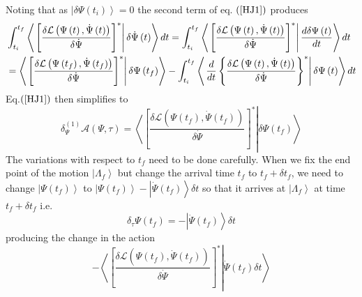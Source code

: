 \documentclass[aps,preprint]{revtex4}
\begin{document}
Noting that as $\left\vert \delta\Psi\left( t_{i}\right) \right\rangle =0$
the second term of eq. $\left( \ref{HJ1}\right) $ produces 
\begin{align}
& \int_{t_{i}}^{t_{f}}\left\langle \left. \left[ \frac{\delta\mathcal{L}%
\left( \Psi\left( t\right) ,\dot{\Psi}\left( t\right) \right) }{\delta\dot{%
\Psi}}\right] ^{\ast}\right\vert \delta\dot{\Psi}\left( t\right)
\right\rangle dt=\int_{t_{i}}^{t_{f}}\left\langle \left. \left[ \frac{\delta%
\mathcal{L}\left( \Psi\left( t\right) ,\dot{\Psi}\left( t\right) \right) }{%
\delta\dot{\Psi}}\right] ^{\ast}\right\vert \frac{d\delta\Psi\left( t\right) 
}{dt}\right\rangle dt  \notag \\
& =\left\langle \left. \left[ \frac{\delta\mathcal{L}\left( \Psi\left(
t_{f}\right) ,\dot{\Psi}\left( t_{f}\right) \right) }{\delta\dot{\Psi}}%
\right] ^{\ast}\right\vert \delta\Psi\left( t_{f}\right) \right\rangle
-\int_{t_{i}}^{t_{f}}\left\langle \left. \frac{d}{dt}\left\{ \frac {\delta%
\mathcal{L}\left( \Psi\left( t\right) ,\dot{\Psi}\left( t\right) \right) }{%
\delta\dot{\Psi}}\right\} ^{\ast}\right\vert \delta\Psi\left( t\right)
\right\rangle dt
\end{align}
Eq.$\left( \ref{HJ1}\right) $ then simplifies to 
\begin{equation}
\delta_{\Psi}^{\left( 1\right) }\mathcal{A}\left( \Psi,\tau\right)
=\left\langle \left. \left[ \frac{\delta\mathcal{L}\left( \Psi\left(
t_{f}\right) ,\dot{\Psi}\left( t_{f}\right) \right) }{\delta\dot{\Psi}}%
\right] ^{\ast}\right\vert \delta\Psi\left( t_{f}\right) \right\rangle
\end{equation}
The variations with respect to $t_{f}$ need to be done carefully. When we
fix the end point of the motion $\left\vert \Lambda_{f}\right\rangle $ but
change the arrival time $t_{f}$ to $t_{f}+\delta t_{f}$, we need to change $%
\left\vert \Psi\left( t_{f}\right) \right\rangle $ to $\left\vert \Psi\left(
t_{f}\right) \right\rangle -\left\vert \dot{\Psi}\left( t_{f}\right)
\right\rangle \delta t$ so that it arrives at $\left\vert
\Lambda_{f}\right\rangle $ at time $t_{f}+\delta t_{f}$ i.e. 
\begin{equation}
\delta_{\tau}\Psi\left( t_{f}\right) =-\left\vert \dot{\Psi}\left(
t_{f}\right) \right\rangle \delta t
\end{equation}
producing the change in the action 
\begin{equation}
-\left\langle \left. \left[ \frac{\delta\mathcal{L}\left( \Psi\left(
t_{f}\right) ,\dot{\Psi}\left( t_{f}\right) \right) }{\delta\dot{\Psi}}%
\right] ^{\ast}\right\vert \dot{\Psi}\left( t_{f}\right) \delta
t\right\rangle
\end{equation}
\end{document}
